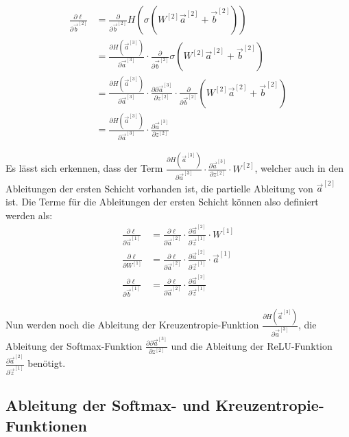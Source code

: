 \documentclass[12pt,titlepage]{article}
\begin{document}
\begin{align*}
  \frac{\partial \ell}{\partial \vec{b}^{[2]}}
   & = \frac{\partial}{\partial \vec{b}^{[2]}} H(\sigma(W^{[2]} \vec{a}^{[2]} + \vec{b}^{[2]}))                                                                                                                      \\
   & = \frac{\partial H(\vec{a}^{[3]})}{\partial \vec{a}^{[3]}} \cdot \frac{\partial}{\partial \vec{b}^{[2]}} \sigma(W^{[2]} \vec{a}^{[2]} + \vec{b}^{[2]})                                                          \\
   & = \frac{\partial H(\vec{a}^{[3]})}{\partial \vec{a}^{[3]}} \cdot \frac{\partial \partial \vec{a}^{[3]}}{\partial z^{[2]}} \cdot \frac{\partial}{\partial \vec{b}^{[2]}} (W^{[2]} \vec{a}^{[2]} + \vec{b}^{[2]}) \\
   & = \frac{\partial H(\vec{a}^{[3]})}{\partial \vec{a}^{[3]}} \cdot \frac{\partial \vec{a}^{[3]}}{\partial z^{[2]}}
\end{align*}

Es lässt sich erkennen, dass der Term \(\frac{\partial H(\vec{a}^{[3]})}{\partial \vec{a}^{[3]}} \cdot \frac{\partial \vec{a}^{[3]}}{\partial z^{[2]}} \cdot W^{[2]}\), welcher auch in den Ableitungen der ersten Schicht vorhanden ist, die partielle Ableitung von \(\vec{a}^{[2]}\) ist. Die Terme für die Ableitungen der ersten Schicht können also definiert werden als:
\begin{align*}
  \frac{\partial \ell}{\partial \vec{a}^{[1]}}
   & = \frac{\partial \ell}{\partial \vec{a}^{[2]}} \cdot \frac{\partial \vec{a}^{[2]}}{\partial \vec{z}^{[1]}} \cdot W^{[1]}       \\
  \frac{\partial \ell}{\partial W^{[1]}}
   & = \frac{\partial \ell}{\partial \vec{a}^{[2]}} \cdot \frac{\partial \vec{a}^{[2]}}{\partial \vec{z}^{[1]}} \cdot \vec{a}^{[1]} \\
  \frac{\partial \ell}{\partial \vec{b}^{[1]}}
   & = \frac{\partial \ell}{\partial \vec{a}^{[2]}} \cdot \frac{\partial \vec{a}^{[2]}}{\partial \vec{z}^{[1]}}
\end{align*}

Nun werden noch die Ableitung der Kreuzentropie-Funktion \(\frac{\partial H(\vec{a}^{[3]})}{\partial \vec{a}^{[3]}}\), die Ableitung der Softmax-Funktion \(\frac{\partial \partial \vec{a}^{[3]}}{\partial z^{[2]}}\) und die Ableitung der ReLU-Funktion \(\frac{\partial \vec{a}^{[2]}}{\partial \vec{z}^{[1]}}\) benötigt.

\subsection{Ableitung der Softmax- und Kreuzentropie-Funktionen}
\end{document}
